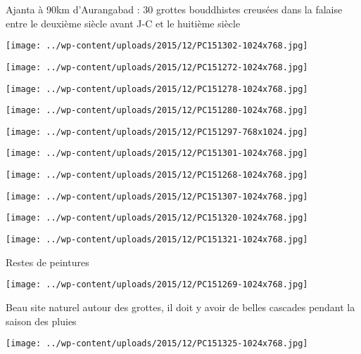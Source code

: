 Ajanta à 90km d'Aurangabad : 30 grottes bouddhistes creusées dans la falaise entre le deuxième siècle avant J-C et le huitième siècle
\begin{center} \texttt{[image: ../wp-content/uploads/2015/12/PC151302-1024x768.jpg]} \end{center}
\begin{center} \texttt{[image: ../wp-content/uploads/2015/12/PC151272-1024x768.jpg]} \end{center}
\begin{center} \texttt{[image: ../wp-content/uploads/2015/12/PC151278-1024x768.jpg]} \end{center}
\begin{center} \texttt{[image: ../wp-content/uploads/2015/12/PC151280-1024x768.jpg]} \end{center}
\begin{center} \texttt{[image: ../wp-content/uploads/2015/12/PC151297-768x1024.jpg]} \end{center}
\begin{center} \texttt{[image: ../wp-content/uploads/2015/12/PC151301-1024x768.jpg]} \end{center}
\begin{center} \texttt{[image: ../wp-content/uploads/2015/12/PC151268-1024x768.jpg]} \end{center}
\begin{center} \texttt{[image: ../wp-content/uploads/2015/12/PC151307-1024x768.jpg]} \end{center}
\begin{center} \texttt{[image: ../wp-content/uploads/2015/12/PC151320-1024x768.jpg]} \end{center}
\begin{center} \texttt{[image: ../wp-content/uploads/2015/12/PC151321-1024x768.jpg]} \end{center}
\pagebreak

Restes de peintures
\begin{center} \texttt{[image: ../wp-content/uploads/2015/12/PC151269-1024x768.jpg]} \end{center}

Beau site naturel autour des grottes, il doit y avoir de belles cascades pendant la saison des pluies 
\begin{center} \texttt{[image: ../wp-content/uploads/2015/12/PC151325-1024x768.jpg]} \end{center}
\pagebreak

